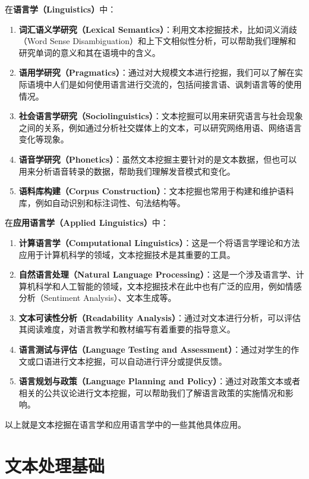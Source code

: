 \documentclass[]{book}
\begin{document}
在\textbf{语言学（Linguistics）}中：

\begin{enumerate}
\def\labelenumi{\arabic{enumi}.}
\item
  \textbf{词汇语义学研究（Lexical Semantics）}：利用文本挖掘技术，比如词义消歧（Word Sense Disambiguation）和上下文相似性分析，可以帮助我们理解和研究单词的意义和其在语境中的含义。
\item
  \textbf{语用学研究（Pragmatics）}：通过对大规模文本进行挖掘，我们可以了解在实际语境中人们是如何使用语言进行交流的，包括间接言语、讽刺语言等的使用情况。
\item
  \textbf{社会语言学研究（Sociolinguistics）}：文本挖掘可以用来研究语言与社会现象之间的关系，例如通过分析社交媒体上的文本，可以研究网络用语、网络语言变化等现象。
\item
  \textbf{语音学研究（Phonetics）}：虽然文本挖掘主要针对的是文本数据，但也可以用来分析语音转录的数据，帮助我们理解发音模式和变化。
\item
  \textbf{语料库构建（Corpus Construction）}：文本挖掘也常用于构建和维护语料库，例如自动识别和标注词性、句法结构等。
\end{enumerate}

在\textbf{应用语言学（Applied Linguistics）}中：

\begin{enumerate}
\def\labelenumi{\arabic{enumi}.}
\item
  \textbf{计算语言学（Computational Linguistics）}：这是一个将语言学理论和方法应用于计算机科学的领域，文本挖掘技术是其重要的工具。
\item
  \textbf{自然语言处理（Natural Language Processing）}：这是一个涉及语言学、计算机科学和人工智能的领域，文本挖掘技术在此中也有广泛的应用，例如情感分析（Sentiment Analysis）、文本生成等。
\item
  \textbf{文本可读性分析（Readability Analysis）}：通过对文本进行分析，可以评估其阅读难度，对语言教学和教材编写有着重要的指导意义。
\item
  \textbf{语言测试与评估（Language Testing and Assessment）}：通过对学生的作文或口语进行文本挖掘，可以自动进行评分或提供反馈。
\item
  \textbf{语言规划与政策（Language Planning and Policy）}：通过对政策文本或者相关的公共议论进行文本挖掘，可以帮助我们了解语言政策的实施情况和影响。
\end{enumerate}

以上就是文本挖掘在语言学和应用语言学中的一些其他具体应用。

\hypertarget{ux6587ux672cux5904ux7406ux57faux7840}{%
\section{文本处理基础}\label{ux6587ux672cux5904ux7406ux57faux7840}}
\end{document}
